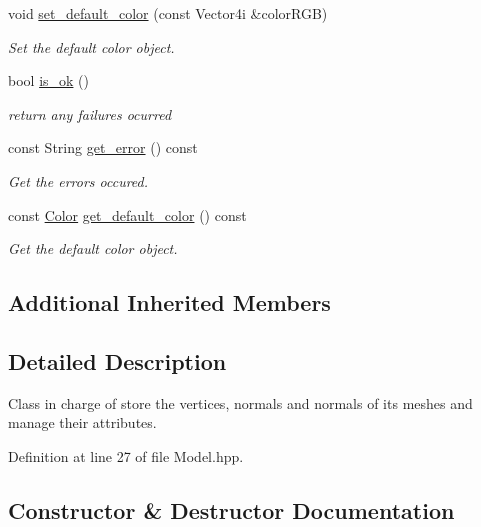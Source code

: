 \begin{DoxyCompactItemize}
void \mbox{\hyperlink{classprzurro_1_1_model_a378be42503fd1bb19f286616fce4274f}{set\+\_\+default\+\_\+color}} (const Vector4i \&color\+R\+GB)
\begin{DoxyCompactList}\small\item\em Set the default color object. \end{DoxyCompactList}\item 
bool \mbox{\hyperlink{classprzurro_1_1_model_a8dbadcaf39085757731d023247a79ec0}{is\+\_\+ok}} ()
\begin{DoxyCompactList}\small\item\em return any failures ocurred \end{DoxyCompactList}\item 
const String \mbox{\hyperlink{classprzurro_1_1_model_acd532e681ed5a48c5e1268419ea74905}{get\+\_\+error}} () const
\begin{DoxyCompactList}\small\item\em Get the errors occured. \end{DoxyCompactList}\item 
const \mbox{\hyperlink{structprzurro_1_1_color___buffer___rgba8888_1_1_color}{Color}} \mbox{\hyperlink{classprzurro_1_1_model_a180104ec9701e878c0ada77b73356b13}{get\+\_\+default\+\_\+color}} () const
\begin{DoxyCompactList}\small\item\em Get the default color object. \end{DoxyCompactList}\end{DoxyCompactItemize}
\subsection*{Additional Inherited Members}


\subsection{Detailed Description}
Class in charge of store the vertices, normals and normals of it\textquotesingle{}s meshes and manage their attributes. 

Definition at line 27 of file Model.\+hpp.



\subsection{Constructor \& Destructor Documentation}
\mbox{\label{classprzurro_1_1_model_aa25706e59d97214c6e2556f45d19d945}} 
